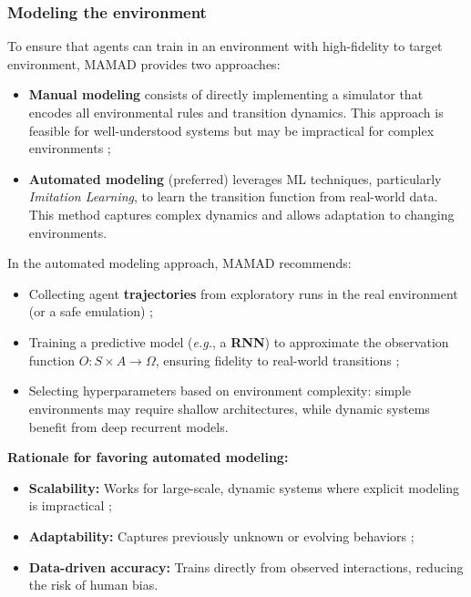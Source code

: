 \documentclass[pdflatex,sn-mathphys-num]{sn-jnl}%
\theoremstyle{thmstyleone}%
\theoremstyle{thmstyletwo}%
\theoremstyle{thmstylethree}%
\begin{document}
\subsubsection{Modeling the environment}

To ensure that agents can train in an environment with high-fidelity to target environment, MAMAD provides two approaches:
\begin{itemize}
    \item \textbf{Manual modeling} consists of directly implementing a simulator that encodes all environmental rules and transition dynamics. This approach is feasible for well-understood systems but may be impractical for complex environments ;
    \item \textbf{Automated modeling} (preferred) leverages ML techniques, particularly \textit{Imitation Learning}, to learn the transition function from real-world data. This method captures complex dynamics and allows adaptation to changing environments.
\end{itemize}

In the automated modeling approach, MAMAD recommends:
\begin{itemize}
    \item Collecting agent \textbf{trajectories} from exploratory runs in the real environment (or a safe emulation) ;
    \item Training a predictive model (\textit{e.g.}, a \textbf{RNN}) to approximate the observation function $\hat{O}: S \times A \to \Omega$, ensuring fidelity to real-world transitions ;
    \item Selecting hyperparameters based on environment complexity: simple environments may require shallow architectures, while dynamic systems benefit from deep recurrent models.
\end{itemize}

\noindent \textbf{Rationale for favoring automated modeling:}
\begin{itemize}
    \item \textbf{Scalability:} Works for large-scale, dynamic systems where explicit modeling is impractical ;
    \item \textbf{Adaptability:} Captures previously unknown or evolving behaviors ;
    \item \textbf{Data-driven accuracy:} Trains directly from observed interactions, reducing the risk of human bias.
\end{itemize}
\end{document}
